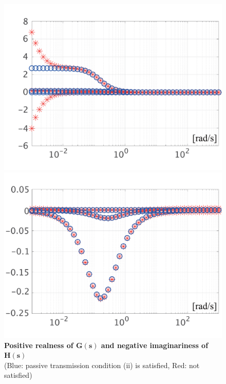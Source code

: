 \documentclass[graybox, envcountchap]{svmult}
\begin{document}
\begin{figure}[t]
  \centering
  {
  \begin{minipage}{0.49\linewidth}
    \centering
    \includegraphics[width = 1.0\linewidth]{figs/eigG}
    \medskip
  \end{minipage}
  \begin{minipage}{0.49\linewidth}
    \centering
    \includegraphics[width = 1.0\linewidth]{figs/eigH}
    \medskip
  \end{minipage}
  }
  \medskip
  \caption{\textbf{Positive realness of $\bm{G(s)}$ and negative imaginariness of$\bm{H(s)}$}
  \\  \centering(Blue: passive transmission condition (ii) is satisfied, Red: not satisfied)}
  \label{fig:eigGH}
\medskip
\end{figure}
\end{document}
